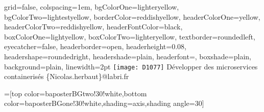 \documentclass[portrait,final,a0paper]{baposter}
\begin{document}
\newlength{\leftimgwidth}
\begin{poster}%
  {
  grid=false,
  colspacing=1em,
  bgColorOne=lighteryellow,
  bgColorTwo=lightestyellow,
  borderColor=reddishyellow,
  headerColorOne=yellow,
  headerColorTwo=reddishyellow,
  headerFontColor=black,
  boxColorOne=lightyellow,
  boxColorTwo=lighteryellow,
  textborder=roundedleft,
  eyecatcher=false,
  headerborder=open,
  headerheight=0.08\textheight,
  headershape=roundedright,
  headershade=plain,
  headerfont=\Large\textsf, %
  boxshade=plain,
  background=plain,
  linewidth=2pt
  }
  {\texttt{[image: D1077]}} %
  {\sf %
   Développer des microservices containerisés}
  {\sf %
  \vspace{1em}\{Nicolas.herbaut\}@labri.fr
  }
  {%
  }

  =[top color=baposterBGtwo!30!white,bottom color=baposterBGone!30!white,shading=axis,shading angle=30]

     \setlength{\leftimgwidth}{0.78em+8.0em}

    \newcommand{\colouredcircle}[1]{%
      \tikz{\useasboundingbox (-0.2em,-0.32em) rectangle(0.2em,0.32em); \draw[draw=black,fill=baposterBGone!80!black!#1!white,line width=0.03em] (0,0) circle(0.18em);}}



\end{poster}
\end{document}
